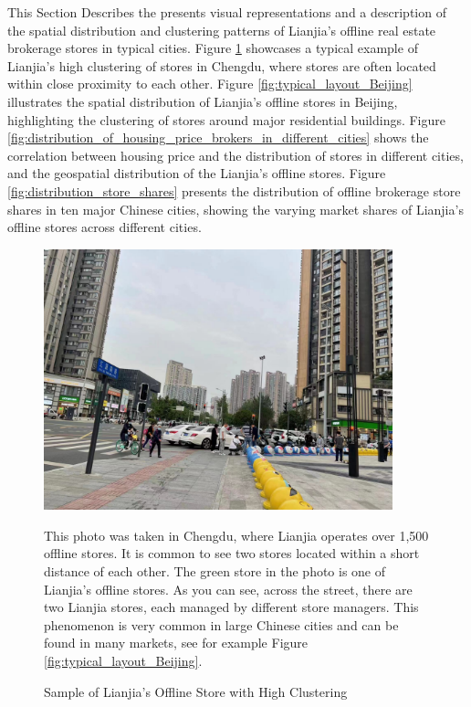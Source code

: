 \documentclass[11pt]{article}
\begin{document}
This Section Describes the presents visual representations and a description of the spatial distribution and clustering patterns of Lianjia's offline real estate brokerage stores in typical cities. Figure \ref{fig:typical_sample_lianjia} showcases a typical example of Lianjia's high clustering of stores in Chengdu, where stores are often located within close proximity to each other. Figure \ref{fig:typical_layout_Beijing} illustrates the spatial distribution of Lianjia's offline stores in Beijing, highlighting the clustering of stores around major residential buildings. Figure \ref{fig:distribution_of_housing_price_brokers_in_different_cities} shows the correlation between housing price and the distribution of stores in different cities, and the geospatial distribution of the Lianjia's offline stores. Figure \ref{fig:distribution_store_shares} presents the distribution of offline brokerage store shares in ten major Chinese cities, showing the varying market shares of Lianjia's offline stores across different cities.

\begin{figure}[H]
  \centering
  \includegraphics[width=0.9\textwidth]{../figures/typical_sample_lianjia.pdf}
  \caption{Sample of Lianjia's Offline Store with High Clustering}
  \label{fig:typical_sample_lianjia}
  
  This photo was taken in Chengdu, where Lianjia operates over 1,500 offline stores. It is common to see two stores located within a short distance of each other. The green store in the photo is one of Lianjia's offline stores. As you can see, across the street, there are two Lianjia stores, each managed by different store managers. This phenomenon is very common in large Chinese cities and can be found in many markets, see for example Figure \ref{fig:typical_layout_Beijing}.
\end{figure}
\end{document}
